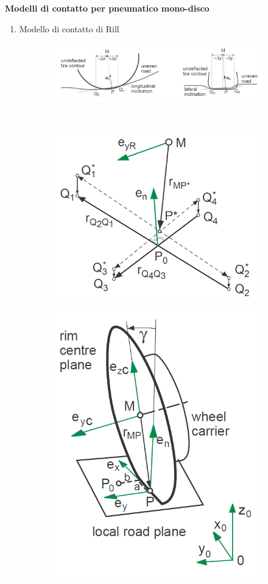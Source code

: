 \documentclass[xcolor=dvipsnames]{beamer} %
\begin{document}
\begin{frame}
	\Large{\textbf{Modelli di contatto per pneumatico mono-disco}}
	\normalsize
	\begin{enumerate}
		\item Modello di contatto di Rill
	\end{enumerate}
\begin{figure}
	\centering
	\begin{subfigure}{\linewidth}
		\centering
		\includegraphics[width=0.8\linewidth]{../Figures/local_plane_1}
	\end{subfigure}\\
	\begin{subfigure}{0.45\linewidth}
		\centering
		\includegraphics[width=0.7\linewidth]{../Figures/local_track}
	\end{subfigure}
	\begin{subfigure}{0.45\linewidth}
		\centering
		\includegraphics[width=0.5\linewidth]{../Figures/contact_geometry_2}
	\end{subfigure}
\end{figure}
		
\end{frame}
\end{document}
